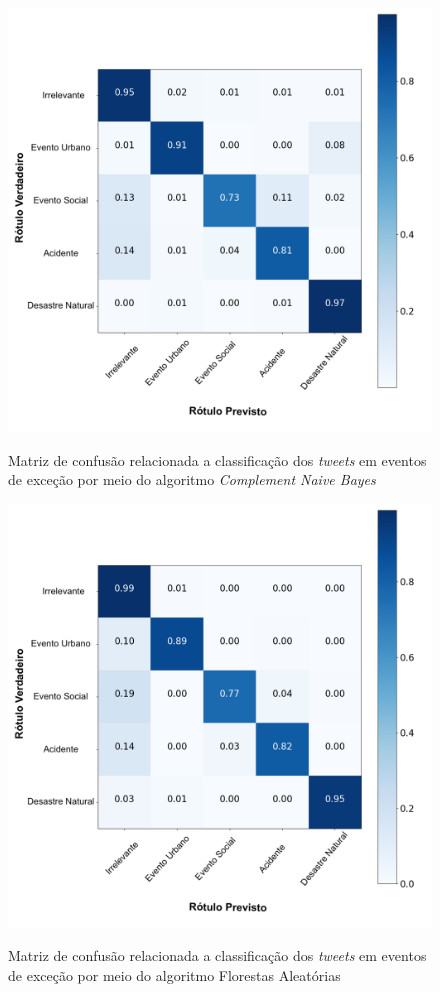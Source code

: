 \documentclass[
	12pt,				%
	oneside,			%
	a4paper,			%
	english,			%
	brazil				%
	]{abntex2ppgsi}
\begin{document}
{{\begin{apendicesenv}
\begin{figure}[!htb]
	\centering
 	  \caption{Matriz de confusão relacionada a classificação dos \textit{tweets} em eventos de exceção por meio do algoritmo \textit{Complement Naive Bayes}}
		\includegraphics[width=1\linewidth]{images/confusion_matrix_cnb_pt.png}
	\label{fig:confusion_matrix_gnb}
\end{figure}

\begin{figure}[!htb]
	\centering
 	  \caption{Matriz de confusão relacionada a classificação dos \textit{tweets} em eventos de exceção por meio do algoritmo Florestas Aleatórias}
		\includegraphics[width=1\linewidth]{images/confusion_matrix_rf_pt.png}
	\label{fig:confusion_matrix_rf}
\end{figure}


\end{apendicesenv}}}
\end{document}

